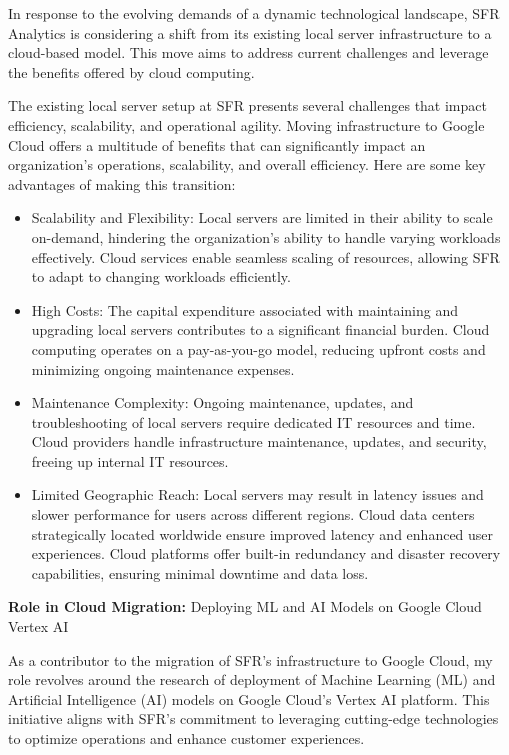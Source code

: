 In response to the evolving demands of a dynamic technological landscape, SFR Analytics is considering a shift from its existing local server infrastructure to a cloud-based model. This move aims to address current challenges and leverage the benefits offered by cloud computing.

The existing local server setup at SFR presents several challenges that impact efficiency, scalability, and operational agility. Moving infrastructure to Google Cloud offers a multitude of benefits that can significantly impact an organization's operations, scalability, and overall efficiency. Here are some key advantages of making this transition:


\begin{itemize}
    \item Scalability and Flexibility: Local servers are limited in their ability to scale on-demand, hindering the organization's ability to handle varying workloads effectively. Cloud services enable seamless scaling of resources, allowing SFR to adapt to changing workloads efficiently.
    
    \item High Costs: The capital expenditure associated with maintaining and upgrading local servers contributes to a significant financial burden. Cloud computing operates on a pay-as-you-go model, reducing upfront costs and minimizing ongoing maintenance expenses.

    \item Maintenance Complexity: Ongoing maintenance, updates, and troubleshooting of local servers require dedicated IT resources and time. Cloud providers handle infrastructure maintenance, updates, and security, freeing up internal IT resources.

    \item Limited Geographic Reach: Local servers may result in latency issues and slower performance for users across different regions. Cloud data centers strategically located worldwide ensure improved latency and enhanced user experiences. Cloud platforms offer built-in redundancy and disaster recovery capabilities, ensuring minimal downtime and data loss.
\end{itemize}

\textbf{Role in Cloud Migration:} Deploying ML and AI Models on Google Cloud Vertex AI

As a contributor to the migration of SFR's infrastructure to Google Cloud, my role revolves around the research of deployment of Machine Learning (ML) and Artificial Intelligence (AI) models on Google Cloud's Vertex AI platform. This initiative aligns with SFR's commitment to leveraging cutting-edge technologies to optimize operations and enhance customer experiences.

